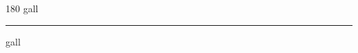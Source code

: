 
\begin{frame}
\begin{center}
\begin{turn}{180}
{\fontsize{2.5cm}{1em}\selectfont gall}
\end{turn}
\vspace{1em}\par  
\hrule
\vspace{1em}\par  
{\fontsize{2.5cm}{1em}\selectfont gall}
\end{center}
\end{frame}
